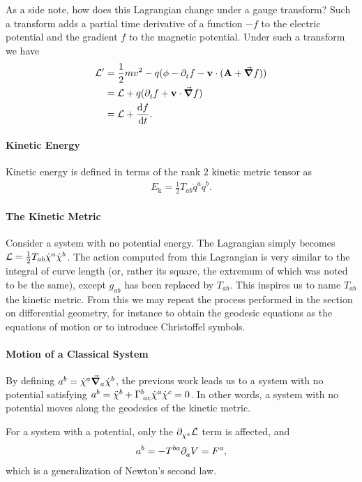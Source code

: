 As a side note, how does this Lagrangian change under a gauge transform? Such a transform adds a partial time derivative of a function $-f$ to the electric potential and the gradient $f$ to the magnetic potential. Under such a transform we have
\begin{align*}
	\mathcal{L}^{\prime} &= \frac{1}{2}mv^{2} - q(\phi - \partial^{}_{t}f  - \vb{v}\cdot(\vb{A} + \grad{f})) \\
	              &= \mathcal{L} + q(\partial^{}_{t}f + \vb{v}\cdot\grad{f}) \\
	              &= \mathcal{L} + \dv{f}{t}.
\end{align*}

\paragraph{Kinetic Energy}
Kinetic energy is defined in terms of the rank $2$ kinetic metric tensor as
\begin{align*}
	E_{\text{k}} = \frac{1}{2}T_{ab}\dot{q}^{a}\dot{q}^{b}.
\end{align*}

\paragraph{The Kinetic Metric}
Consider a system with no potential energy. The Lagrangian simply becomes $\mathcal{L} = \frac{1}{2}T_{ab}\dot{\chi}^{a}\dot{\chi}^{b}$. The action computed from this Lagrangian is very similar to the integral of curve length (or, rather its square, the extremum of which was noted to be the same), except $g_{ab}$ has been replaced by $T_{ab}$. This inspires us to name $T_{ab}$ the kinetic metric. From this we may repeat the process performed in the section on differential geometry, for instance to obtain the geodesic equations as the equations of motion or to introduce Christoffel symbols.

\paragraph{Motion of a Classical System}
By defining $a^{b} = \dot{\chi}^{a}\grad_{a}{\dot{\chi}^{b}}$, the previous work leads us to a system with no potential satisfying $a^{b} = \ddot{\chi}^{b} + \Gamma^{b}_{\;ac}\dot{\chi}^{a}\dot{\chi}^{c} = 0$. In other words, a system with no potential moves along the geodesics of the kinetic metric.

For a system with a potential, only the $\partial^{}_{\chi^{a}}\mathcal{L}$ term is affected, and
\begin{align*}
	a^{b} = - T^{ba}\partial^{}_{a}V = F^{a},
\end{align*}
which is a generalization of Newton's second law.

